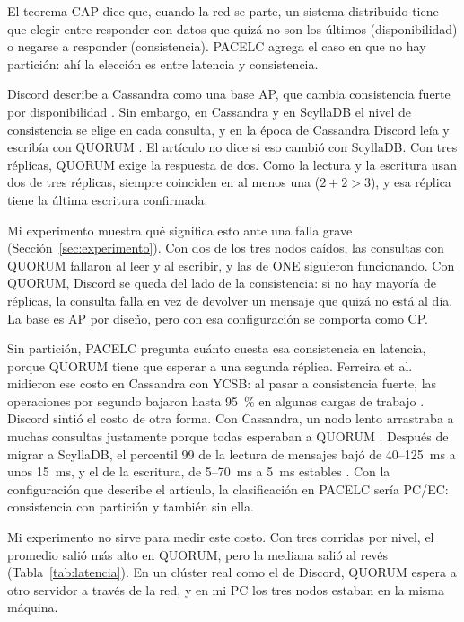 \documentclass[11pt,a4paper]{article}
\begin{document}
El teorema CAP dice que, cuando la red se parte, un sistema distribuido tiene que elegir entre responder con datos que quizá no son los últimos (disponibilidad) o negarse a responder (consistencia). PACELC agrega el caso en que no hay partición: ahí la elección es entre latencia y consistencia.

Discord describe a Cassandra como una base AP, que cambia consistencia fuerte por disponibilidad \cite{Vishnevskiy2017billions}. Sin embargo, en Cassandra y en ScyllaDB el nivel de consistencia se elige en cada consulta, y en la época de Cassandra Discord leía y escribía con QUORUM \cite{Ingram2023}. El artículo no dice si eso cambió con ScyllaDB. Con tres réplicas, QUORUM exige la respuesta de dos. Como la lectura y la escritura usan dos de tres réplicas, siempre coinciden en al menos una ($2 + 2 > 3$), y esa réplica tiene la última escritura confirmada.

Mi experimento muestra qué significa esto ante una falla grave (Sección~\ref{sec:experimento}). Con dos de los tres nodos caídos, las consultas con QUORUM fallaron al leer y al escribir, y las de ONE siguieron funcionando. Con QUORUM, Discord se queda del lado de la consistencia: si no hay mayoría de réplicas, la consulta falla en vez de devolver un mensaje que quizá no está al día. La base es AP por diseño, pero con esa configuración se comporta como CP.

Sin partición, PACELC pregunta cuánto cuesta esa consistencia en latencia, porque QUORUM tiene que esperar a una segunda réplica. Ferreira et al. midieron ese costo en Cassandra con YCSB: al pasar a consistencia fuerte, las operaciones por segundo bajaron hasta 95~\% en algunas cargas de trabajo \cite{Ferreira2025}. Discord sintió el costo de otra forma. Con Cassandra, un nodo lento arrastraba a muchas consultas justamente porque todas esperaban a QUORUM \cite{Ingram2023}. Después de migrar a ScyllaDB, el percentil 99 de la lectura de mensajes bajó de 40--125~ms a unos 15~ms, y el de la escritura, de 5--70~ms a 5~ms estables \cite{Ingram2023}. Con la configuración que describe el artículo, la clasificación en PACELC sería PC/EC: consistencia con partición y también sin ella.

Mi experimento no sirve para medir este costo. Con tres corridas por nivel, el promedio salió más alto en QUORUM, pero la mediana salió al revés (Tabla~\ref{tab:latencia}). En un clúster real como el de Discord, QUORUM espera a otro servidor a través de la red, y en mi PC los tres nodos estaban en la misma máquina.
\end{document}
